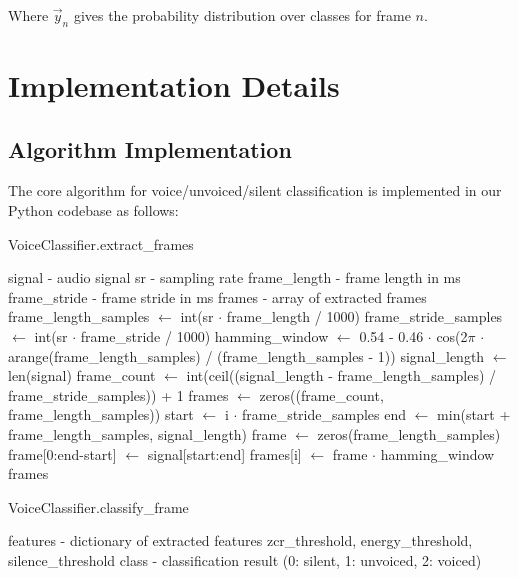 \documentclass[10pt,journal,compsoc]{IEEEtran}
\begin{document}
Where $\vec{y}_n$ gives the probability distribution over classes for frame $n$.

\section{Implementation Details}

\subsection{Algorithm Implementation}
The core algorithm for voice/unvoiced/silent classification is implemented in our Python codebase as follows:

\begin{algorithm}
\caption{VoiceClassifier.extract\_frames}
\begin{algorithmic}[1]
\REQUIRE signal - audio signal
\REQUIRE sr - sampling rate
\REQUIRE frame\_length - frame length in ms
\REQUIRE frame\_stride - frame stride in ms
\ENSURE frames - array of extracted frames
\STATE frame\_length\_samples $\leftarrow$ int(sr $\cdot$ frame\_length / 1000)
\STATE frame\_stride\_samples $\leftarrow$ int(sr $\cdot$ frame\_stride / 1000)
\STATE hamming\_window $\leftarrow$ 0.54 - 0.46 $\cdot$ cos(2$\pi$ $\cdot$ arange(frame\_length\_samples) / (frame\_length\_samples - 1))
\STATE signal\_length $\leftarrow$ len(signal)
\STATE frame\_count $\leftarrow$ int(ceil((signal\_length - frame\_length\_samples) / frame\_stride\_samples)) + 1
\STATE frames $\leftarrow$ zeros((frame\_count, frame\_length\_samples))
    \STATE start $\leftarrow$ i $\cdot$ frame\_stride\_samples
    \STATE end $\leftarrow$ min(start + frame\_length\_samples, signal\_length)
    \STATE frame $\leftarrow$ zeros(frame\_length\_samples)
    \STATE frame[0:end-start] $\leftarrow$ signal[start:end]
    \STATE frames[i] $\leftarrow$ frame $\cdot$ hamming\_window
\ENDFOR
\RETURN frames
\end{algorithmic}
\end{algorithm}

\begin{algorithm}
\caption{VoiceClassifier.classify\_frame}
\begin{algorithmic}[1]
\REQUIRE features - dictionary of extracted features
\REQUIRE zcr\_threshold, energy\_threshold, silence\_threshold
\ENSURE class - classification result (0: silent, 1: unvoiced, 2: voiced)
     
\ENDIF
{}
     
\ELSE
     
\ENDIF
\end{algorithmic}
\end{algorithm}
\end{document}
